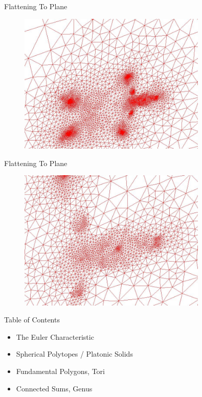 \documentclass{beamer}
\begin{document}
\begin{frame}{Flattening To Plane}

\begin{figure}[t]
    \includegraphics[width=0.8\textwidth]{homerparam3.jpg}
\end{figure}

\end{frame}

\begin{frame}{Flattening To Plane}

\begin{figure}[t]
    \includegraphics[width=0.8\textwidth]{homerparam4.jpg}
\end{figure}

\end{frame}

\begin{frame}{Table of Contents}
\begin{itemize}[label=$\vartriangleright$]
	\item The Euler Characteristic
\end{itemize}
\begin{itemize}[label=$\vartriangleright$]
	\item Spherical Polytopes / Platonic Solids
\end{itemize}
\begin{itemize}[label=$\blacktriangleright$]
	\item Fundamental Polygons, Tori
\end{itemize}
\begin{itemize}[label=$\vartriangleright$]
	\item Connected Sums, Genus
\end{itemize}
\end{frame}
\end{document}

